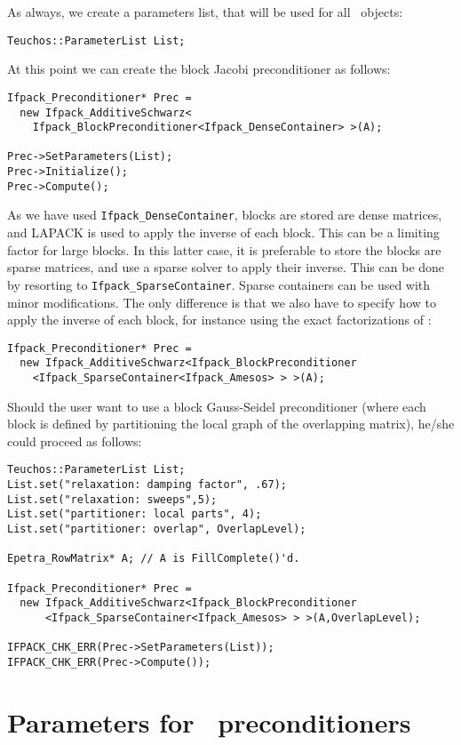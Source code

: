 As always, we create a parameters list, that will be used
for all \ifpack\ objects:
\begin{verbatim}
Teuchos::ParameterList List;
\end{verbatim}
At this point we can create the block Jacobi preconditioner as follows:
\begin{verbatim}
Ifpack_Preconditioner* Prec = 
  new Ifpack_AdditiveSchwarz<
    Ifpack_BlockPreconditioner<Ifpack_DenseContainer> >(A);

Prec->SetParameters(List);
Prec->Initialize();
Prec->Compute();
\end{verbatim}
As we have used {\tt Ifpack\_DenseContainer}, blocks are stored are dense
matrices, and LAPACK is used to apply the inverse of each block. This can be a
limiting factor for large blocks. In this latter case, it is preferable to
store the blocks are sparse matrices, and use a sparse solver to apply their
inverse. This can be done by resorting to {\tt Ifpack\_SparseContainer}. 
Sparse containers can be used with minor modifications. The only difference is
that we also have to specify how to apply the inverse of each block, for
instance using the exact factorizations of \amesos:
\begin{verbatim}
Ifpack_Preconditioner* Prec = 
  new Ifpack_AdditiveSchwarz<Ifpack_BlockPreconditioner
    <Ifpack_SparseContainer<Ifpack_Amesos> > >(A);
\end{verbatim}

Should the user want to use a block Gauss-Seidel preconditioner (where each
block is defined by partitioning the local graph of the overlapping matrix),
he/she could proceed as follows:
\begin{verbatim}
Teuchos::ParameterList List;
List.set("relaxation: damping factor", .67);
List.set("relaxation: sweeps",5);
List.set("partitioner: local parts", 4);
List.set("partitioner: overlap", OverlapLevel);

Epetra_RowMatrix* A; // A is FillComplete()'d.

Ifpack_Preconditioner* Prec =
  new Ifpack_AdditiveSchwarz<Ifpack_BlockPreconditioner
      <Ifpack_SparseContainer<Ifpack_Amesos> > >(A,OverlapLevel);

IFPACK_CHK_ERR(Prec->SetParameters(List));
IFPACK_CHK_ERR(Prec->Compute());
\end{verbatim}

\section{Parameters for \ifpack\ preconditioners}
\label{sec:parameters}

